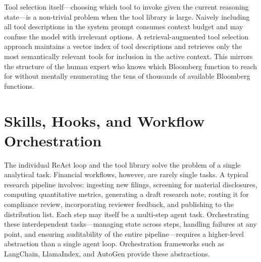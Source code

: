 \begin{deepdive}
Tool selection itself---choosing which tool to invoke given the current reasoning
state---is a non-trivial problem when the tool library is large. Naively including all
tool descriptions in the system prompt consumes context budget and may confuse the
model with irrelevant options. A retrieval-augmented tool selection approach maintains
a vector index of tool descriptions and retrieves only the most semantically relevant
tools for inclusion in the active context. This mirrors the structure of the human
expert who knows which Bloomberg function to reach for without mentally enumerating
the tens of thousands of available Bloomberg functions.

\end{deepdive}


\section{Skills, Hooks, and Workflow Orchestration}
\label{sec:orchestration}

\begin{context}
The individual ReAct loop and the tool library solve the problem of a single analytical
task. Financial workflows, however, are rarely single tasks. A typical research pipeline
involves: ingesting new filings, screening for material disclosures, computing
quantitative metrics, generating a draft research note, routing it for compliance review,
incorporating reviewer feedback, and publishing to the distribution list. Each step
may itself be a multi-step agent task. Orchestrating these interdependent tasks---managing
state across steps, handling failures at any point, and ensuring auditability of the
entire pipeline---requires a higher-level abstraction than a single agent loop.
Orchestration frameworks such as LangChain, LlamaIndex, and AutoGen provide these
abstractions.
\end{context}

